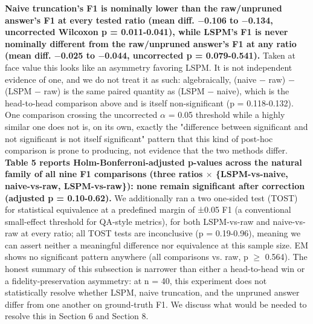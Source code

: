 \documentclass[pdflatex,sn-basic,Numbered]{sn-jnl}
\begin{document}
\textbf{Naive truncation's F1 is nominally lower than the raw/unpruned answer's F1 at every tested ratio (mean diff. $-$0.106 to $-$0.134, uncorrected Wilcoxon p = 0.011-0.041), while LSPM's F1 is never nominally different from the raw/unpruned answer's F1 at any ratio (mean diff. $-$0.025 to $-$0.044, uncorrected p = 0.079-0.541).} Taken at face value this looks like an asymmetry favoring LSPM. It is not independent evidence of one, and we do not treat it as such: algebraically, (naive $-$ raw) $-$ (LSPM $-$ raw) is the same paired quantity as (LSPM $-$ naive), which is the head-to-head comparison above and is itself non-significant (p = 0.118-0.132). One comparison crossing the uncorrected $\alpha$ = 0.05 threshold while a highly similar one does not is, on its own, exactly the "difference between significant and not significant is not itself significant" pattern that this kind of post-hoc comparison is prone to producing, not evidence that the two methods differ. \textbf{Table 5 reports Holm-Bonferroni-adjusted p-values across the natural family of all nine F1 comparisons (three ratios $\times$ \{LSPM-vs-naive, naive-vs-raw, LSPM-vs-raw\}): none remain significant after correction (adjusted p = 0.10-0.62).} We additionally ran a two one-sided test (TOST) for statistical equivalence at a predefined margin of ±0.05 F1 (a conventional small-effect threshold for QA-style metrics), for both LSPM-vs-raw and naive-vs-raw at every ratio; all TOST tests are inconclusive (p = 0.19-0.96), meaning we can assert neither a meaningful difference nor equivalence at this sample size. EM shows no significant pattern anywhere (all comparisons vs. raw, p $\geq$ 0.564). The honest summary of this subsection is narrower than either a head-to-head win or a fidelity-preservation asymmetry: at n = 40, this experiment does not statistically resolve whether LSPM, naive truncation, and the unpruned answer differ from one another on ground-truth F1. We discuss what would be needed to resolve this in Section 6 and Section 8.
\end{document}
